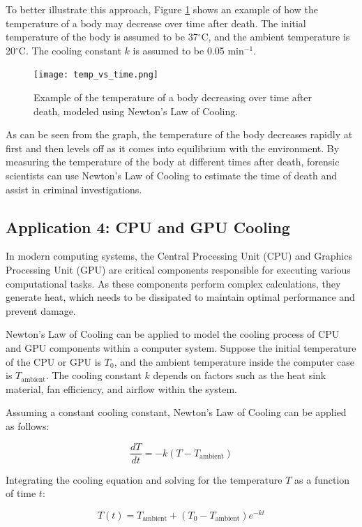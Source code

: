 \documentclass[12pt, a4paper]{article}
\begin{document}
To better illustrate this approach, Figure \ref{fig:temp_vs_time} shows an example of how the temperature of a body may decrease over time after death. The initial temperature of the body is assumed to be 37$^\circ$C, and the ambient temperature is 20$^\circ$C. The cooling constant $k$ is assumed to be 0.05 min$^{-1}$.

\begin{figure}[htbp]
\centering
\texttt{[image: temp\_vs\_time.png]}
\caption{Example of the temperature of a body decreasing over time after death, modeled using Newton's Law of Cooling.}
\label{fig:temp_vs_time}
\end{figure}

As can be seen from the graph, the temperature of the body decreases rapidly at first and then levels off as it comes into equilibrium with the environment. By measuring the temperature of the body at different times after death, forensic scientists can use Newton's Law of Cooling to estimate the time of death and assist in criminal investigations.

\subsection{Application 4: CPU and GPU Cooling}
In modern computing systems, the Central Processing Unit (CPU) and Graphics Processing Unit (GPU) are critical components responsible for executing various computational tasks. As these components perform complex calculations, they generate heat, which needs to be dissipated to maintain optimal performance and prevent damage.

Newton's Law of Cooling can be applied to model the cooling process of CPU and GPU components within a computer system. Suppose the initial temperature of the CPU or GPU is $T_0$, and the ambient temperature inside the computer case is $T_{\text{ambient}}$. The cooling constant $k$ depends on factors such as the heat sink material, fan efficiency, and airflow within the system.

Assuming a constant cooling constant, Newton's Law of Cooling can be applied as follows:

\begin{equation}
\frac{dT}{dt} = -k(T - T_{\text{ambient}})
\end{equation}

Integrating the cooling equation and solving for the temperature $T$ as a function of time $t$:

\begin{equation}
T(t) = T_{\text{ambient}} + (T_0 - T_{\text{ambient}}) e^{-kt}
\end{equation}
\end{document}
